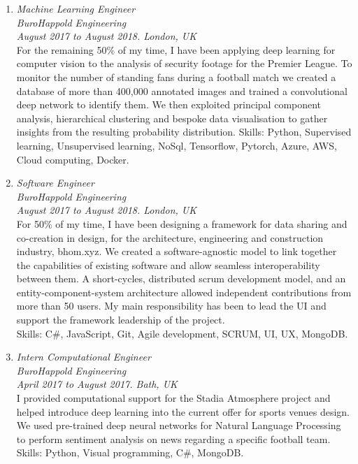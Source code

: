\begin{enumerate}[leftmargin=0.45cm, itemsep=1em, topsep=0.5em, parsep=0.2em]
        \item
        \emph{Machine Learning Engineer} \\
        \emph{BuroHappold Engineering} \\
        \textit{August 2017 to August 2018. London, UK} \vspace{0.2em} \\
        {For the remaining 50\% of my time, I have been applying deep learning for computer vision to the analysis of security footage for the Premier League. To monitor the number of standing fans during a football match we created a database of more than 400,000 annotated images and trained a convolutional deep network to identify them. We then exploited principal component analysis, hierarchical clustering and bespoke data visualisation to gather insights from the resulting probability distribution.}
        Skills: Python, Supervised learning, Unsupervised learning, NoSql, Tensorflow, Pytorch, Azure, AWS, Cloud computing, Docker.

        \item
        \emph{Software Engineer} \\
        \emph{BuroHappold Engineering} \\
        \textit{August 2017 to August 2018. London, UK}  \vspace{0.2em} \\
        {For 50\% of my time, I have been designing a framework for data sharing and co-creation in design, for the architecture, engineering and construction industry, bhom.xyz. We created a software-agnostic model to link together the capabilities of existing software and allow seamless interoperability between them. A short-cycles, distributed scrum development model, and an entity-component-system architecture allowed independent contributions from more than 50 users. My main responsibility has been to lead the UI and support the framework leadership of the project.} \\
        Skills: C\#, JavaScript, Git, Agile development, SCRUM, UI, UX, MongoDB.

        \item
        \emph{Intern Computational Engineer} \\
        \emph{BuroHappold Engineering} \\
        \textit{April 2017 to August 2017. Bath, UK} \vspace{0.2em} \\
        {I provided computational support for the Stadia Atmosphere project and helped introduce deep learning into the current offer for sports venues design. We used pre-trained deep neural networks for Natural Language Processing to perform sentiment analysis on news regarding a specific football team.} \\
        Skills: Python, Visual programming, C\#, MongoDB.


\end{enumerate}
